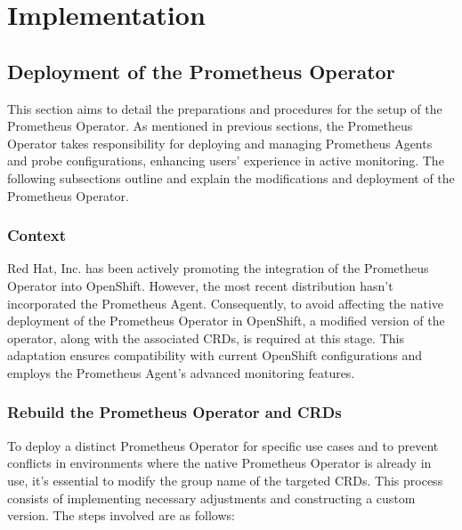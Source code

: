 
\chapter{Implementation}\label{chapter:implementation}

\section{Deployment of the Prometheus Operator}

This section aims to detail the preparations and procedures for the setup of the Prometheus Operator. As mentioned in previous sections, the Prometheus Operator takes responsibility for deploying and managing Prometheus Agents and probe configurations, enhancing users' experience in active monitoring. The following subsections outline and explain the modifications and deployment of the Prometheus Operator. 

\subsection{Context}

Red Hat, Inc. has been actively promoting the integration of the Prometheus Operator into OpenShift. However, the most recent distribution hasn't incorporated the Prometheus Agent. Consequently, to avoid affecting the native deployment of the Prometheus Operator in OpenShift, a modified version of the operator, along with the associated \ac{CRD}s, is required at this stage. This adaptation ensures compatibility with current OpenShift configurations and employs the Prometheus Agent's advanced monitoring features. 

\subsection{Rebuild the Prometheus Operator and \ac{CRD}s}

To deploy a distinct Prometheus Operator for specific use cases and to prevent conflicts in environments where the native Prometheus Operator is already in use, it's essential to modify the group name of the targeted \ac{CRD}s. This process consists of implementing necessary adjustments and constructing a custom version. The steps involved are as follows: 

